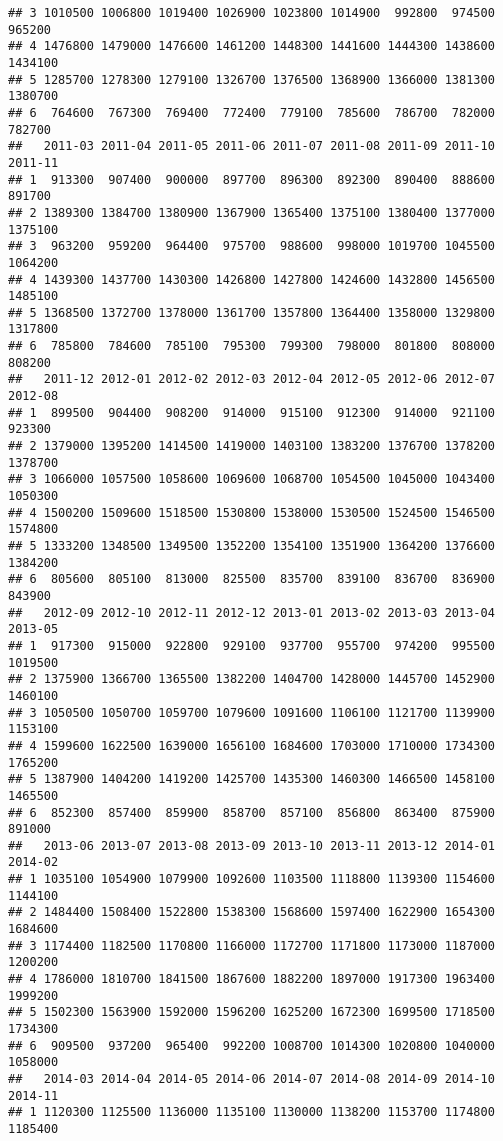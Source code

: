 \documentclass[
]{article}
\begin{document}
\begin{verbatim}
## 3 1010500 1006800 1019400 1026900 1023800 1014900  992800  974500  965200
## 4 1476800 1479000 1476600 1461200 1448300 1441600 1444300 1438600 1434100
## 5 1285700 1278300 1279100 1326700 1376500 1368900 1366000 1381300 1380700
## 6  764600  767300  769400  772400  779100  785600  786700  782000  782700
##   2011-03 2011-04 2011-05 2011-06 2011-07 2011-08 2011-09 2011-10 2011-11
## 1  913300  907400  900000  897700  896300  892300  890400  888600  891700
## 2 1389300 1384700 1380900 1367900 1365400 1375100 1380400 1377000 1375100
## 3  963200  959200  964400  975700  988600  998000 1019700 1045500 1064200
## 4 1439300 1437700 1430300 1426800 1427800 1424600 1432800 1456500 1485100
## 5 1368500 1372700 1378000 1361700 1357800 1364400 1358000 1329800 1317800
## 6  785800  784600  785100  795300  799300  798000  801800  808000  808200
##   2011-12 2012-01 2012-02 2012-03 2012-04 2012-05 2012-06 2012-07 2012-08
## 1  899500  904400  908200  914000  915100  912300  914000  921100  923300
## 2 1379000 1395200 1414500 1419000 1403100 1383200 1376700 1378200 1378700
## 3 1066000 1057500 1058600 1069600 1068700 1054500 1045000 1043400 1050300
## 4 1500200 1509600 1518500 1530800 1538000 1530500 1524500 1546500 1574800
## 5 1333200 1348500 1349500 1352200 1354100 1351900 1364200 1376600 1384200
## 6  805600  805100  813000  825500  835700  839100  836700  836900  843900
##   2012-09 2012-10 2012-11 2012-12 2013-01 2013-02 2013-03 2013-04 2013-05
## 1  917300  915000  922800  929100  937700  955700  974200  995500 1019500
## 2 1375900 1366700 1365500 1382200 1404700 1428000 1445700 1452900 1460100
## 3 1050500 1050700 1059700 1079600 1091600 1106100 1121700 1139900 1153100
## 4 1599600 1622500 1639000 1656100 1684600 1703000 1710000 1734300 1765200
## 5 1387900 1404200 1419200 1425700 1435300 1460300 1466500 1458100 1465500
## 6  852300  857400  859900  858700  857100  856800  863400  875900  891000
##   2013-06 2013-07 2013-08 2013-09 2013-10 2013-11 2013-12 2014-01 2014-02
## 1 1035100 1054900 1079900 1092600 1103500 1118800 1139300 1154600 1144100
## 2 1484400 1508400 1522800 1538300 1568600 1597400 1622900 1654300 1684600
## 3 1174400 1182500 1170800 1166000 1172700 1171800 1173000 1187000 1200200
## 4 1786000 1810700 1841500 1867600 1882200 1897000 1917300 1963400 1999200
## 5 1502300 1563900 1592000 1596200 1625200 1672300 1699500 1718500 1734300
## 6  909500  937200  965400  992200 1008700 1014300 1020800 1040000 1058000
##   2014-03 2014-04 2014-05 2014-06 2014-07 2014-08 2014-09 2014-10 2014-11
## 1 1120300 1125500 1136000 1135100 1130000 1138200 1153700 1174800 1185400

\end{verbatim}
\end{document}
